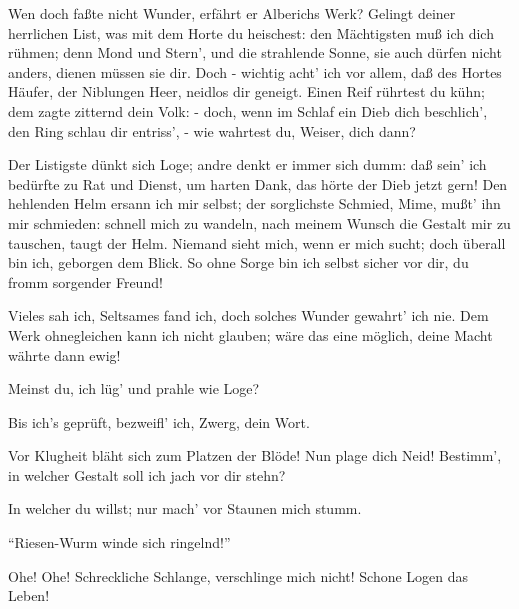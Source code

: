 \begin{drama}

Wen doch faßte nicht Wunder,
erfährt er Alberichs Werk?
Gelingt deiner herrlichen List,
was mit dem Horte du heischest:
den Mächtigsten muß ich dich rühmen;
denn Mond und Stern', und die strahlende Sonne,
sie auch dürfen nicht anders,
dienen müssen sie dir.
Doch - wichtig acht' ich vor allem,
daß des Hortes Häufer, der Niblungen Heer,
neidlos dir geneigt.
Einen Reif rührtest du kühn;
dem zagte zitternd dein Volk: -
doch, wenn im Schlaf ein Dieb dich beschlich',
den Ring schlau dir entriss', -
wie wahrtest du, Weiser, dich dann?
 

\Alberichspeaks
Der Listigste dünkt sich Loge;
andre denkt er immer sich dumm:
daß sein' ich bedürfte zu Rat und Dienst,
um harten Dank,
das hörte der Dieb jetzt gern!
Den hehlenden Helm ersann ich mir selbst;
der sorglichste Schmied,
Mime, mußt' ihn mir schmieden:
schnell mich zu wandeln, nach meinem Wunsch
die Gestalt mir zu tauschen, taugt der Helm.
Niemand sieht mich, wenn er mich sucht;
doch überall bin ich, geborgen dem Blick.
So ohne Sorge
bin ich selbst sicher vor dir,
du fromm sorgender Freund!
 

\Logespeaks
Vieles sah ich, Seltsames fand ich,
doch solches Wunder gewahrt' ich nie.
Dem Werk ohnegleichen kann ich nicht glauben;
wäre das eine möglich,
deine Macht währte dann ewig!
 

\Alberichspeaks
Meinst du, ich lüg' und prahle wie Loge?
 

\Logespeaks
Bis ich's geprüft,
bezweifl' ich, Zwerg, dein Wort.
 

\Alberichspeaks
Vor Klugheit bläht sich
zum Platzen der Blöde!
Nun plage dich Neid!
Bestimm', in welcher Gestalt
soll ich jach vor dir stehn?
 

\Logespeaks
In welcher du willst;
nur mach' vor Staunen mich stumm.
 

\Alberichspeaks


``Riesen-Wurm winde sich ringelnd!''
 




\Logespeaks


Ohe! Ohe!
Schreckliche Schlange, verschlinge mich nicht!
Schone Logen das Leben!
 


\end{drama}
